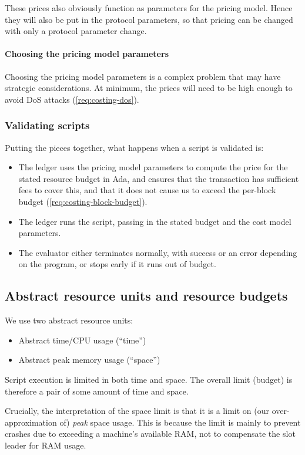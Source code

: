 These prices also obviously function as parameters for the pricing model.
Hence they will also be put in the protocol parameters, so that pricing can be changed with only a protocol parameter change.

\paragraph{Choosing the pricing model parameters}
Choosing the pricing model parameters is a complex problem that may have strategic considerations.
At minimum, the prices will need to be high enough to avoid DoS attacks (\cref{req:costing-dos}).

\subsubsection{Validating scripts}
Putting the pieces together, what happens when a script is validated is:
\begin{itemize}
\item
  The ledger uses the pricing model parameters to compute the price for the stated resource budget in Ada, and ensures that the transaction has sufficient fees to cover this, and that it does not cause us to exceed the per-block budget (\cref{req:costing-block-budget}).
\item
  The ledger runs the script, passing in the stated budget and the cost model parameters.
\item
  The evaluator either terminates normally, with success or an error depending on the program, or stops early if it runs out of budget.
\end{itemize}

\subsection{Abstract resource units and resource budgets}
\label{sec:costing-units}
We use two abstract resource units:
\begin{itemize}
\item Abstract time/CPU usage (``\gls{time}'')
\item Abstract peak memory usage (``\gls{space}'')
\end{itemize}

Script execution is limited in both \gls{time} and \gls{space}.
The overall limit (budget) is therefore a pair of some amount of \gls{time} and \gls{space}.

Crucially, the interpretation of the \gls{space} limit is that it is a limit on (our over-approximation of) \emph{peak} space usage.
This is because the limit is mainly to prevent crashes due to exceeding a machine's available RAM, not to compensate the slot leader for RAM usage.

